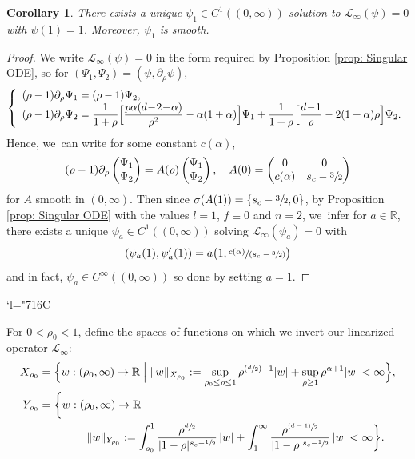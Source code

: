 \documentclass[JEP,XML,SOM,Unicode]{cedram}
\newcommand{\Changelback}{\mathcode`l="716C}
\newcommand{\Psfrac}[2]{(\sfrac{#1}{#2})}
\newcommand{\psfrac}[2]{\sfrac{(#1)}{#2}}
\newcommand{\spfrac}[2]{\sfrac{#1}{(#2)}}
\let\dpl\displaystyle
\let\ra\rightarrow
\theoremstyle{plain}
\newtheorem{corollary}[proposition]{Corollary}
\theoremstyle{definition}
\begin{document}
\begin{corollary}
\label{Cor: psi_1}
There exists a unique $\psi_1\in C^1((0,\infty))$ solution to $\mathcal L_\infty (\psi)=0$ with $\psi(1)=1$. Moreover, $\psi_1$ is smooth.
\end{corollary}
\begin{proof}
We write $\mathcal L_\infty(\psi)=0$ in the form required by Proposition \ref{prop: Singular ODE}, so for $(\Psi_1,\Psi_2)=(\psi,\partial_\rho\psi)$,
\[
\left\{\begin{array}{l}
(\rho-1)\partial_\rho\Psi_1=(\rho-1)\Psi_2,\\
\dpl(\rho-1)\partial_\rho\Psi_2=\frac{1}{1+\rho}\Bigl[\frac{p\alpha(d\!-\!2\!-\!\alpha)}{\rho^2}-\alpha(1+\alpha)\Bigr]\Psi_1+\frac{1}{1+\rho}\Bigl[\frac{d\!-\!1}{\rho}-2(1+\alpha)\rho\Bigr]\Psi_2.
\end{array}\right.
\]
Hence, we~can write for some constant $c(\alpha)$,
\[
(\rho-1)\partial_\rho
\begin{pmatrix}
\Psi_1\\ \Psi_2
\end{pmatrix}
=A(\rho)
\begin{pmatrix}
\Psi_1\\ \Psi_2
\end{pmatrix},
\quad A(0)=
\begin{pmatrix}
0 & 0\\
c(\alpha) & s_c-\sfrac{3}{2}
\end{pmatrix}
\]
for $A$ smooth in $(0,\infty)$. Then since $\sigma(A(1))=\{s_c-\sfrac{3}{2},0\}$, by Proposition \ref{prop: Singular ODE} with the values $l=1$, $f\equiv 0$ and $n=2$, we~infer for $a\in\mathbb R$, there exists a unique $\psi_a\in C^1((0,\infty))$ solving $\mathcal L_\infty(\psi_a)=0$ with
\[
(\psi_a(1),\psi_a'(1))=a\bigl(1,\spfrac{c(\alpha)} {s_c-\sfrac 32}\bigr)
\]
and in fact, $\psi_a\in C^\infty((0,\infty))$ so done by setting $a=1$.
\end{proof}

\Changelback

For $0<\rho_0<1$, define the spaces of functions on which we invert our linearized operator $\mathcal L_\infty$:
\begin{equation}
\label{eq: X_rho_0}
\begin{aligned}
X_{\rho_0}&=\Big\{ w:(\rho_0,\infty)\ra \mathbb R\Bigm| \Vert w\Vert_{X_{\rho_0}}:=\sup_{\rho_0\le\rho\le1}\rho^{\Psfrac{d}{2}-1} |w|+\sup_{\rho\ge1}\rho^{\alpha+1}|w|<\infty\Big\},\\
Y_{\rho_0}&=\bigg\{ w:(\rho_0,\infty)\ra \mathbb R\Bigm|\\
&\hspace*{1.5cm}\Vert w\Vert_{Y_{\rho_0}}:=\int_{\rho_0}^1 \frac{\rho^{\sfrac{d}{2}}}{|1-\rho|^{s_c-\sfrac{1}{2}}}\,|w|+\int_{1}^\infty \frac{\rho^{\psfrac{d-1}{2}}}{|1-\rho|^{s_c-\sfrac{1}{2}}}\,|w|<\infty\bigg\}.
\end{aligned}
\end{equation}
\end{document}
